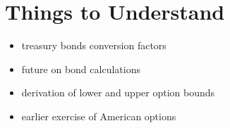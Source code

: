 \chapter{Things to Understand}

\begin{itemize}
	\item treasury bonds conversion factors
	\item future on bond calculations
	\item derivation of lower and upper option bounds
	\item earlier exercise of American options
\end{itemize}